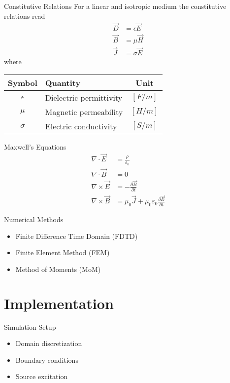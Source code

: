 \documentclass[aspectratio=54,xcolor=dvipsnames]{beamer}
\begin{document}
\begin{frame}{Constitutive Relations}
    For a linear and isotropic medium the constitutive relations read
    \begin{align*}
        \vec{D} &= \epsilon \vec{E} \\
        \vec{B} &= \mu \vec{H} \\
        \vec{J} &= \sigma \vec{E}
    \end{align*}
    \vspace{0.5em}
    where
    \begin{center}
    \begin{tabular}{|c|l|c|}
        \hline
        Symbol & Quantity & Unit \\
        \hline
        $\epsilon$ & Dielectric permittivity & $[F/m]$ \\
        $\mu$ & Magnetic permeability & $[H/m]$ \\
        $\sigma$ & Electric conductivity & $[S/m]$ \\
        \hline
    \end{tabular}
    \end{center}
\end{frame}

\begin{frame}{Maxwell's Equations}
    \begin{align*}
        \nabla \cdot \vec{E} &= \frac{\rho}{\varepsilon_0} \\
        \nabla \cdot \vec{B} &= 0 \\
        \nabla \times \vec{E} &= -\frac{\partial \vec{B}}{\partial t} \\
        \nabla \times \vec{B} &= \mu_0 \vec{J} + \mu_0 \varepsilon_0 \frac{\partial \vec{E}}{\partial t}
    \end{align*}
\end{frame}

\begin{frame}{Numerical Methods}
    \begin{itemize}
        \item Finite Difference Time Domain (FDTD)
        \item Finite Element Method (FEM)
        \item Method of Moments (MoM)
    \end{itemize}
\end{frame}

\section{Implementation}
\begin{frame}{Simulation Setup}
    \begin{itemize}
        \item Domain discretization
        \item Boundary conditions
        \item Source excitation
    \end{itemize}
\end{frame}
\end{document}
